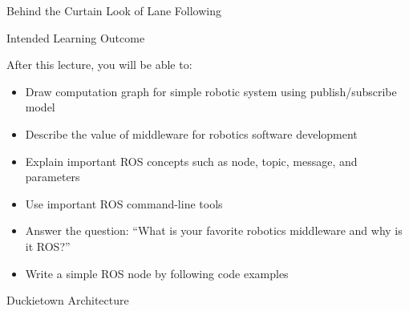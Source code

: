 \documentclass[aspectratio=43]{beamer}
\begin{document}
\begin{frame}{Behind the Curtain Look of Lane Following}
	\begin{center}
	\end{center}
\end{frame}

\begin{frame}{Intended Learning Outcome}
	\begin{block}{After this lecture, you will be able to:}
		\begin{itemize}
			\item<1> Draw computation graph for simple robotic system using publish/subscribe model
			\item<0> Describe the value of middleware for robotics software development
			\item<0> Explain important ROS concepts such as node, topic, message, and parameters
			\item<0> Use important ROS command-line tools
			\item<0> Answer the question: ``What is your favorite robotics middleware and why is it ROS?''
			\item<0> Write a simple ROS node by following code examples
		\end{itemize}
	\end{block}
\end{frame}

\begin{frame}{Duckietown Architecture}
\begin{center}
\end{center}
\end{frame}
\end{document}

